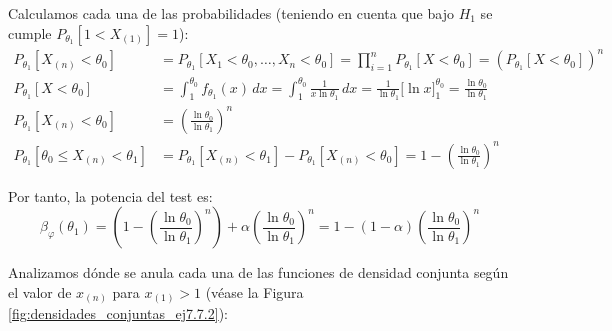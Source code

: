 \begin{ejercicio}
\begin{description}
        Calculamos cada una de las probabilidades (teniendo en cuenta que bajo $H_1$ se cumple $P_{\theta_1}[1 < X_{(1)}] = 1$):
        \begin{align*}
            P_{\theta_1}[X_{(n)} < \theta_0] &= P_{\theta_1}[X_1 < \theta_0, \ldots, X_n < \theta_0] = \prod_{i=1}^{n} P_{\theta_1}[X < \theta_0] = \left(P_{\theta_1}[X < \theta_0]\right)^n \\
            P_{\theta_1}[X < \theta_0] &= \int_{1}^{\theta_0} f_{\theta_1}(x)\,dx = \int_{1}^{\theta_0} \frac{1}{x \ln \theta_1}\,dx = \frac{1}{\ln \theta_1}\Big[\ln x\Big]_{1}^{\theta_0} = \frac{\ln \theta_0}{\ln \theta_1} \\
            P_{\theta_1}[X_{(n)} < \theta_0] &= \left(\frac{\ln \theta_0}{\ln \theta_1}\right)^n \\
            P_{\theta_1}[\theta_0 \leq X_{(n)} < \theta_1] &= P_{\theta_1}[X_{(n)} < \theta_1] - P_{\theta_1}[X_{(n)} < \theta_0] = 1 - \left(\frac{\ln \theta_0}{\ln \theta_1}\right)^n
        \end{align*}

        Por tanto, la potencia del test es:
        \begin{equation*}
            \beta_\varphi(\theta_1) = \left(1 - \left(\frac{\ln \theta_0}{\ln \theta_1}\right)^n\right) + \alpha \left(\frac{\ln \theta_0}{\ln \theta_1}\right)^n = 1 - (1-\alpha)\left(\frac{\ln \theta_0}{\ln \theta_1}\right)^n
        \end{equation*}

        \item[Caso $\theta_0 > \theta_1$.] Analizamos dónde se anula cada una de las funciones de densidad conjunta según el valor de $x_{(n)}$ para $x_{(1)} > 1$ (véase la Figura \ref{fig:densidades_conjuntas_ej7.7.2}):
        \begin{figure}[h]
            \centering
\end{figure}
\end{description}
\end{ejercicio}
